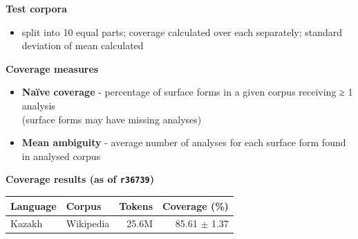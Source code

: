\documentclass[a0paper,fontscale=0.3]{baposter}  %
\newcommand{\htwo}[1]{{\htwofont \textbf{\dotfill{}#1\dotfill{}}}}
\begin{document}
\begin{poster}
{			\htwo{Test corpora}
			\begin{itemize}
				\item split into 10 equal parts; coverage calculated over each separately; standard deviation of mean calculated
			\end{itemize}
			\htwo{Coverage measures}
			\begin{itemize}
				\item \textbf{Naïve coverage} - percentage of surface forms in a given corpus receiving ≥ 1 analysis\\(surface forms may have missing analyses)
				\item \textbf{Mean ambiguity} - average number of analyses for each surface form found in analysed corpus
			\end{itemize}
			\htwo{Coverage results (as of \texttt{r36739})}\\
			\begin{tabular}{llrr}
				\toprule
				\textbf{Language} & \textbf{Corpus} & \textbf{Tokens} & \textbf{Coverage} (\%) \\
				\midrule
				\multirow{4}{*}{Kazakh} & Wikipedia & 25.6M & 85.61 $\pm$ 1.37 \\

\end{tabular}}
\end{poster}
\end{document}
